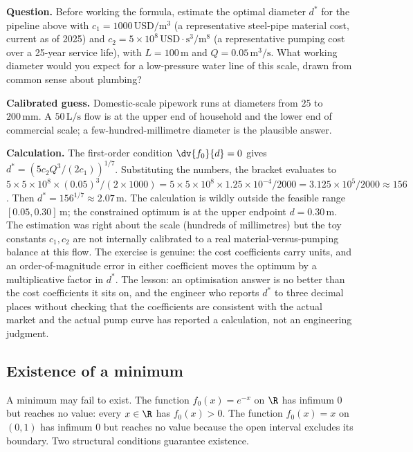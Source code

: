 \begin{estimation}
\textbf{Question.} Before working the formula, estimate the optimal
diameter $d^{*}$ for the pipeline above with $c_{1} =
1000\,\text{USD}/\si{\meter\cubed}$ (a representative steel-pipe
material cost, current as of 2025) and $c_{2} = 5 \times 10^{8}
\,\text{USD}\cdot\si{\second\cubed\per\meter\tothe{8}}$ (a
representative pumping cost over a 25-year service life), with $L
= 100\,\si{\meter}$ and $Q = 0.05\,\si{\cubic\meter\per\second}$.
What working diameter would you expect for a low-pressure water
line of this scale, drawn from common sense about plumbing?

\textbf{Calibrated guess.} Domestic-scale pipework runs at
diameters from $25$ to $200\,\si{\milli\meter}$. A $50\,\text{L/s}$
flow is at the upper end of household and the lower end of
commercial scale; a few-hundred-millimetre diameter is the
plausible answer.

\textbf{Calculation.} The first-order condition
$\dv{f_{0}}{d} = 0$ gives $d^{*} = (5 c_{2} Q^{3} / (2 c_{1}))^{1/7}$.
Substituting the numbers, the bracket evaluates to $5 \times 5 \times
10^{8} \times (0.05)^{3} / (2 \times 1000) = 5 \times 5 \times
10^{8} \times 1.25 \times 10^{-4} / 2000 = 3.125 \times 10^{5} /
2000 \approx 156$. Then $d^{*} = 156^{1/7} \approx 2.07
\,\si{\meter}$. The calculation is wildly outside the feasible
range $[0.05, 0.30]\,\si{\meter}$; the constrained optimum is at
the upper endpoint $d = 0.30\,\si{\meter}$. The estimation was
right about the scale (hundreds of millimetres) but the toy
constants $c_{1}, c_{2}$ are not internally calibrated to a real
material-versus-pumping balance at this flow. The exercise is
genuine: the cost coefficients carry units, and an
order-of-magnitude error in either coefficient moves the optimum
by a multiplicative factor in $d^{*}$. The lesson: an
optimisation answer is no better than the cost coefficients it
sits on, and the engineer who reports $d^{*}$ to three decimal
places without checking that the coefficients are consistent with
the actual market and the actual pump curve has reported a
calculation, not an engineering judgment.
\end{estimation}

\subsection{Existence of a minimum}

A minimum may fail to exist. The function $f_{0}(x) = e^{-x}$ on
$\R$ has infimum $0$ but reaches no value: every $x \in \R$ has
$f_{0}(x) > 0$. The function $f_{0}(x) = x$ on $(0, 1)$ has
infimum $0$ but reaches no value because the open interval
excludes its boundary. Two structural conditions guarantee
existence.

